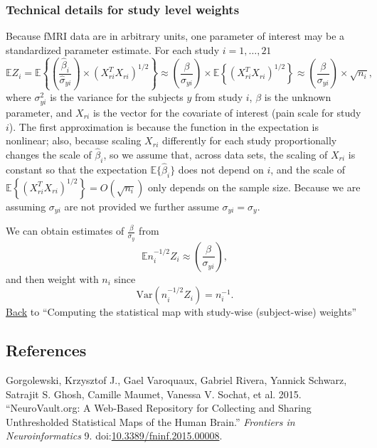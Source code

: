 \documentclass[]{article}
\begin{document}
\subsubsection{Technical details for study level
weights}\label{technical-details-for-study-level-weights}

Because fMRI data are in arbitrary units, one parameter of interest may
be a standardized parameter estimate. For each study \(i=1, \ldots, 21\)
\[ \mathbb{E} Z_i = \mathbb{E} \left\{\left(\frac{\hat{\beta}_i}{ \hat{\sigma}_{yi}}\right) \times (X_{ri}^TX_{ri})^{1/2} \right\}
\approx \left(\frac{\beta}{\sigma_{yi}}\right) \times \mathbb{E}\left\{(X_{ri}^TX_{ri})^{1/2} \right\} \approx \left(\frac{\beta}{\sigma_{yi}} \right) \times \sqrt{n_i},\]
where \(\sigma^2_{yi}\) is the variance for the subjects \(y\) from
study \(i\), \(\beta\) is the unknown parameter, and \(X_{ri}\) is the
vector for the covariate of interest (pain scale for study \(i\)). The
first approximation is because the function in the expectation is
nonlinear; also, because scaling \(X_{ri}\) differently for each study
proportionally changes the scale of \(\hat \beta_i\), so we assume that,
across data sets, the scaling of \(X_{ri}\) is constant so that the
expectation \(\mathbb{E}\{\hat{\beta}_i\}\) does not depend on \(i\),
and the scale of
\(\mathbb{E}\left\{(X_{ri}^TX_{ri})^{1/2} \right\} = O(\sqrt{n_i})\)
only depends on the sample size. Because we are assuming \(\sigma_{yi}\)
are not provided we further assume \(\sigma_{yi} = \sigma_y\).

We can obtain estimates of \(\frac{\beta}{\sigma_y}\) from \[
\mathbb{E}n_i^{-1/2}Z_i \approx \left(\frac{\beta}{\sigma_{yi}} \right),
\] and then weight with \(n_i\) since \[
\text{Var}(n_i^{-1/2} Z_i) = n_i^{-1}.
\] \protect\hyperlink{technical_details_return}{Back} to ``Computing the
statistical map with study-wise (subject-wise) weights''

\subsection*{References}\label{references}

\hypertarget{refs}{}
\hypertarget{ref-gorgolewski_neurovault.org:_2015}{}
Gorgolewski, Krzysztof J., Gael Varoquaux, Gabriel Rivera, Yannick
Schwarz, Satrajit S. Ghosh, Camille Maumet, Vanessa V. Sochat, et al.
2015. ``NeuroVault.org: A Web-Based Repository for Collecting and
Sharing Unthresholded Statistical Maps of the Human Brain.''
\emph{Frontiers in Neuroinformatics} 9.
doi:\href{https://doi.org/10.3389/fninf.2015.00008}{10.3389/fninf.2015.00008}.
\end{document}
